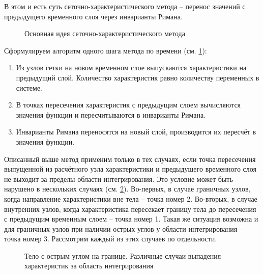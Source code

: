 В этом и есть суть сеточно-характеристического метода -- перенос значений с предыдущего временного слоя через инварианты Римана.
\begin{figure}[H]
	\caption{Основная идея сеточно-характеристического метода}
	\label{pic:gcm-idea}
\end{figure}
Сформулируем алгоритм одного шага метода по времени (см. \ref{pic:gcm-idea}):
\begin{enumerate}
	\item Из узлов сетки на новом временном слое выпускаются характеристики на предыдущий слой. Количество характеристик равно количеству переменных в системе.
	\item В точках пересечения характеристик с предыдущим слоем вычисляются значения функции и пересчитываются в инварианты Римана.
	\item Инварианты Римана переносятся на новый слой, производится их пересчёт в значения функции.
\end{enumerate}

Описанный выше метод применим только в тех случаях, если точка пересечения выпущенной из расчётного узла характеристики и предыдущего временного слоя не выходит за пределы области интегрирования. Это условие может быть нарушено в нескольких случаях (см. \ref{pic:outer-cases}). Во-первых, в случае граничных узлов, когда направление характеристики вне тела -- точка номер 2. Во-вторых, в случае внутренних узлов, когда характеристика пересекает границу тела до пересечения с предыдущим временным слоем -- точка номер 1. Такая же ситуация возможна и для граничных узлов при наличии острых углов у области интегрирования -- точка номер 3. Рассмотрим каждый из этих случаев по отдельности.
\begin{figure}[H]
	\caption{Тело с острым углом на границе. Различные случаи выпадения характеристик за область интегрирования}
	\label{pic:outer-cases}
\end{figure}


